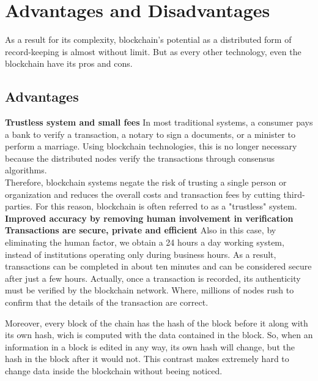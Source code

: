\section{Advantages and Disadvantages}
\label{sec:evaluate}

As a result for its complexity, blockchain's potential as a distributed 
form of record-keeping is almost without limit. But as every other 
technology, even the blockchain have its pros and cons. 

\subsection{Advantages}
\label{sec:advantages}

\textbf{Trustless system and small fees}
In most traditional systems, a consumer pays a bank to verify a transaction,   
a notary to sign a documents, or a minister to perform a marriage. Using 
blockchain technologies, this is no longer necessary because the distributed
nodes verify the transactions through consensus algorithms.\\
Therefore, blockchain systems negate the risk of trusting a single person or 
organization and reduces the overall costs and transaction fees by cutting 
third-parties. For this reason, blockchain is often referred to as a "trustless"
system.\cite{binancevision}\cite{investopedia}
\bigskip\\
\textbf{Improved accuracy by removing human involvement in verification} 
\bigskip\\
\textbf{Transactions are secure, private and efficient}
Also in this case, by eliminating the human factor, we obtain a 24 hours a day 
working system, instead of institutions operating only during business hours.
As a result, transactions can be completed in about ten minutes and can be 
considered secure after just a few hours. Actually, once a transaction is 
recorded, its authenticity must be verified by the blockchain network. Where, 
millions of nodes rush to confirm that the details of the transaction are correct.

Moreover, every block of the chain has the hash of the block before it along with
its own hash, wich is computed with the data contained in the block. So, when
an information in a block is edited in any way, its own hash will change, but the
hash in the block after it would not. This contrast makes extremely hard to 
change data inside the blockchain without beeing noticed.

